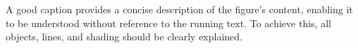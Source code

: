 


\noindent A good caption provides a concise description of the figure's content, enabling it to be understood without reference to the running text.
To achieve this, all objects, lines, and shading should be clearly explained.
